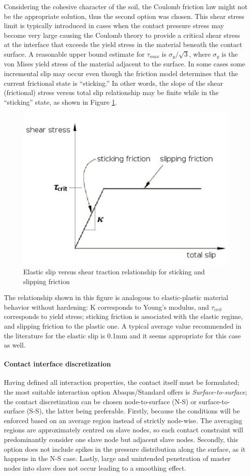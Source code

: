 Considering the cohesive character of the soil, the Coulomb friction law might not be the appropriate solution, thus the second option was chosen. This shear stress limit is typically introduced in cases when the contact pressure stress may become very large causing the Coulomb theory to provide a critical shear stress at the interface that exceeds the yield stress in the material beneath the contact surface. A reasonable upper bound estimate for $\tau_{max}$ is $\sigma_y/\sqrt{3}$, where $\sigma_y$ is the von Mises yield stress of the material adjacent to the surface. In some cases some incremental slip may occur even though the friction model determines that the current frictional state is “sticking.” In other words, the slope of the shear (frictional) stress versus total slip relationship may be finite while in the “sticking” state, as shown in Figure \ref{stick}.

\begin{figure}[!h]
	\centering
	\includegraphics[width=0.5\linewidth]{"stick"}
	\caption{Elastic slip versus shear traction relationship for sticking and slipping friction}
	\label{stick}
\end{figure} 

The relationship shown in this figure is analogous to elastic-plastic material behavior without hardening: K corresponds to Young's modulus, and $\tau_{crit}$ corresponds to yield stress; sticking friction is associated with the elastic regime, and slipping friction to the plastic one. A typical average value recommended in the literature for the elastic slip is 0.1mm and it seems appropriate for this case as well.

\paragraph{Contact interface discretization}
Having defined all interaction properties, the contact itself must be formulated; the most suitable interaction option Abaqus/Standard offers is \textit{Surface-to-surface}; the contact discretization can be chosen node-to-surface (N-S) or surface-to-surface (S-S), the latter being preferable. Firstly, because the conditions will be enforced based on an average region instead of strictly node-wise. The averaging regions are approximately centred on slave nodes, so each contact constraint will predominantly consider one slave node but adjacent slave nodes. Secondly, this option does not include spikes in the pressure distribution along the surface, as it happens in the N-S case. Lastly, large and unintended penetration of master nodes into slave does not occur leading to a smoothing effect.


